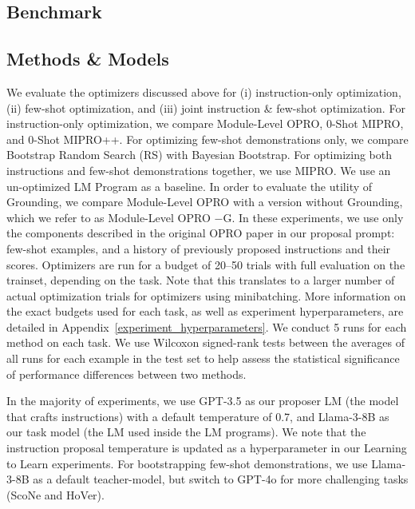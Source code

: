 \label{sec:experiments}


\subsection{Benchmark}\label{sec:benchmark}





\subsection{Methods \& Models}

We evaluate the optimizers discussed above for (i) instruction-only optimization, (ii) few-shot optimization, and (iii) joint instruction \& few-shot optimization. For instruction-only optimization, we compare Module-Level OPRO, 0-Shot MIPRO, and 0-Shot MIPRO++. For optimizing few-shot demonstrations only, we compare Bootstrap Random Search (RS) with Bayesian Bootstrap. For optimizing both instructions and few-shot demonstrations together, we use MIPRO. We use an un-optimized LM Program as a baseline. In order to evaluate the utility of Grounding, we compare Module-Level OPRO with a version without Grounding, which we refer to as Module-Level OPRO $-$G. In these experiments, we use only the components described in the original OPRO paper in our proposal prompt: few-shot examples, and a history of previously proposed instructions and their scores. Optimizers are run for a budget of 20--50 trials with full evaluation on the trainset, depending on the task. Note that this translates to a larger number of actual optimization trials for optimizers using minibatching. More information on the exact budgets used for each task, as well as experiment hyperparameters, are detailed in Appendix~\ref{experiment_hyperparameters}. We conduct 5 runs for each method on each task. We use Wilcoxon signed-rank  tests between the averages of all runs for each example in the test set to help assess the statistical significance of performance differences between two methods.

In the majority of experiments, we use GPT-3.5 as our proposer LM (the model that crafts instructions) with a default temperature of 0.7, and Llama-3-8B as our task model (the LM used inside the LM programs). We note that the instruction proposal temperature is updated as a hyperparameter in our Learning to Learn experiments. For bootstrapping few-shot demonstrations, we use Llama-3-8B as a default teacher-model, but switch to GPT-4o for more challenging tasks (ScoNe and HoVer). 




